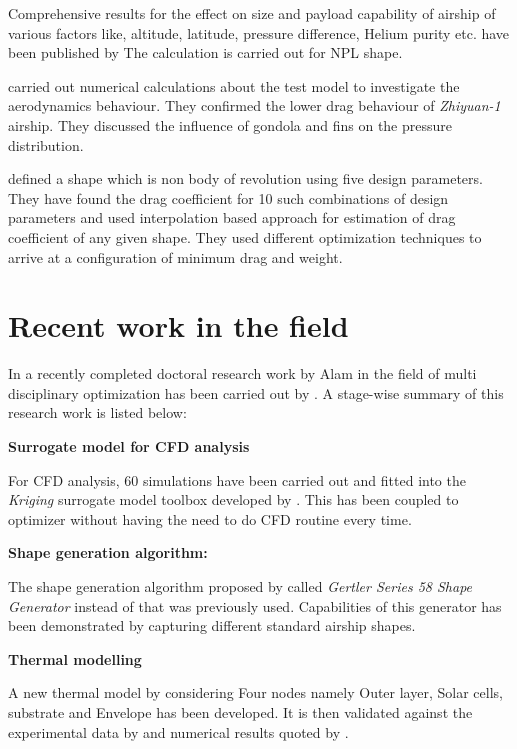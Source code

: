 Comprehensive results for the effect on size and payload capability of airship of various
factors like, altitude, latitude, pressure difference, Helium purity etc. have been published
by \cite{Chen2010} The calculation is carried out for NPL shape.


\cite{Liu2013c} carried out numerical calculations about the test model to investigate the aerodynamics behaviour. They confirmed the lower drag behaviour of \textit{Zhiyuan-1} airship. They discussed the influence of gondola and fins on the pressure distribution.

\cite{Ceruti2013b} defined a shape which is non body of revolution using five design parameters. They have found the drag coefficient for 10 such combinations of design parameters and used interpolation based approach for estimation of drag coefficient of any given shape. They used different optimization techniques to arrive at a configuration of minimum drag and weight. 


\section{Recent work in the field}

In a recently completed doctoral research work by Alam \cite{recent_thesis} in the field of multi disciplinary optimization has been carried out by \cite{alam2016mdo}. A stage-wise summary of this  research work is listed below:

\textbf{Surrogate model for CFD analysis}

For CFD analysis, 60 simulations have been carried out and fitted into the \textit{Kriging} surrogate model toolbox developed by \cite{viana2014metamodeling}. This has been coupled to optimizer without having the need to do CFD routine every time.


\textbf{Shape generation algorithm:}

The shape generation algorithm proposed by \cite{gertler1950} called \textit{Gertler Series 58 Shape Generator} instead of \cite{Wang2010} that was previously used. Capabilities of this generator has been demonstrated by capturing different standard airship shapes. 

\textbf{Thermal modelling}

A new thermal model by considering Four nodes namely Outer layer, Solar cells, substrate and Envelope has been developed. It is then validated against the experimental data by \cite{Harada2003a} and numerical results quoted by \cite{Liu2014a}.

